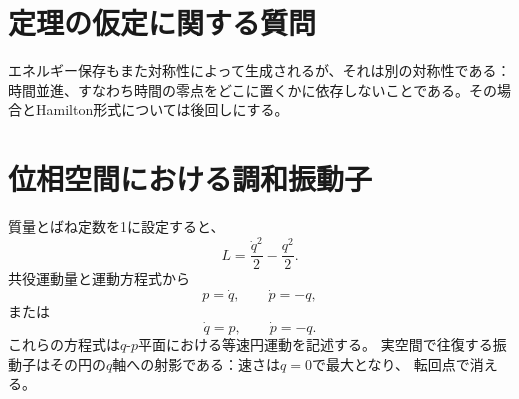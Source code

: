 \section{定理の仮定に関する質問}

\begin{classroomqa}
\end{classroomqa}

\begin{classroomqa}
\end{classroomqa}

エネルギー保存もまた対称性によって生成されるが、それは別の対称性である：時間並進、すなわち時間の零点をどこに置くかに依存しないことである。その場合とHamilton形式については後回しにする。

\begin{classroomqa}
\end{classroomqa}

\section{位相空間における調和振動子}

質量とばね定数を1に設定すると、
\begin{equation}
  L=\frac{\dot q^2}{2}-\frac{q^2}{2}.
  \label{eq:oscillator-l4}
\end{equation}
共役運動量と運動方程式から
\begin{equation}
  p=\dot q,
  \qquad
  \dot p=-q,
  \label{eq:oscillator-first-order-l4}
\end{equation}
または
\begin{equation}
  \dot q=p,
  \qquad
  \dot p=-q.
  \label{eq:oscillator-phase-flow}
\end{equation}
これらの方程式は\(q\)-\(p\)平面における等速円運動を記述する。
実空間で往復する振動子はその円の\(q\)軸への射影である：速さは\(q=0\)で最大となり、
転回点で消える。

